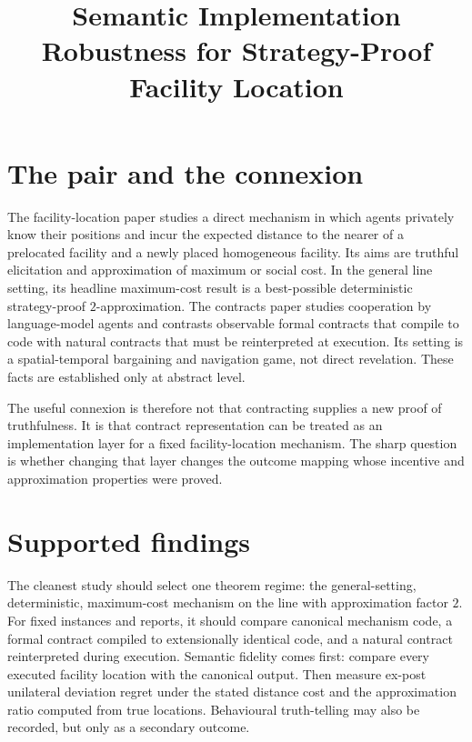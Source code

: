 \documentclass{article}
\title{Semantic Implementation Robustness for Strategy-Proof Facility Location}
\begin{document}
\maketitle

\section{The pair and the connexion}

The facility-location paper studies a direct mechanism in which agents privately know their positions and incur the expected distance to the nearer of a prelocated facility and a newly placed homogeneous facility.  Its aims are truthful elicitation and approximation of maximum or social cost.  In the general line setting, its headline maximum-cost result is a best-possible deterministic strategy-proof \(2\)-approximation.  The contracts paper studies cooperation by language-model agents and contrasts observable formal contracts that compile to code with natural contracts that must be reinterpreted at execution.  Its setting is a spatial-temporal bargaining and navigation game, not direct revelation.  These facts are established only at abstract level. 

The useful connexion is therefore not that contracting supplies a new proof of truthfulness.  It is that contract representation can be treated as an implementation layer for a fixed facility-location mechanism.  The sharp question is whether changing that layer changes the outcome mapping whose incentive and approximation properties were proved. 

\section{Supported findings}

The cleanest study should select one theorem regime: the general-setting, deterministic, maximum-cost mechanism on the line with approximation factor \(2\).  For fixed instances and reports, it should compare canonical mechanism code, a formal contract compiled to extensionally identical code, and a natural contract reinterpreted during execution.  Semantic fidelity comes first: compare every executed facility location with the canonical output.  Then measure ex-post unilateral deviation regret under the stated distance cost and the approximation ratio computed from true locations.  Behavioural truth-telling may also be recorded, but only as a secondary outcome. 
\end{document}
